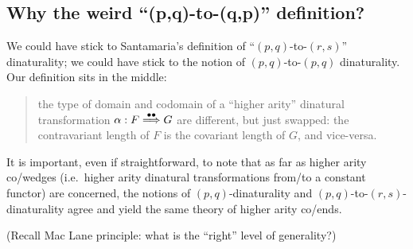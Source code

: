 \documentclass[11pt]{amsart}
\begin{document}
\subsection{Why the weird ``(p,q)-to-(q,p)'' definition?}
We could have stick to Santamaria's definition of ``$(p,q)$-to-$(r,s)$'' dinaturality; we could have stick to the notion of $(p,q)$-to-$(p,q)$ dinaturality. Our definition sits in the middle:
\begin{quote}
	the type of domain and codomain of a ``higher arity'' dinatural transformation $\alpha : F \overset{\bullet\bullet}\Longrightarrow G$ are different, but just swapped: the contravariant length of $F$ is the covariant length of $G$, and vice-versa.
\end{quote}
It is important, even if straightforward, to note that as far as higher arity co/wedges (i.e.\ higher arity dinatural transformations from/to a constant functor) are concerned, the notions of $(p,q)$-dinaturality and $(p,q)$-to-$(r,s)$-dinaturality agree and yield the same theory of higher arity co/ends.

(Recall Mac Lane principle: what is the ``right'' level of generality?)
\end{document}
